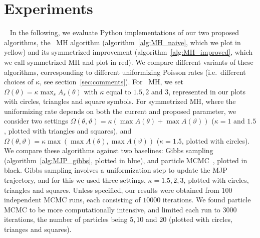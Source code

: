 \vspace{-.2in}
\section{Experiments}\label{sec:expts}~
In the following, we evaluate Python implementations of our two proposed
algorithms, the \naive\ MH algorithm (algorithm~\ref{alg:MH_naive}, which we
plot in yellow) and its symmetrized improvement (algorithm~\ref{alg:MH_improved}, 
which we call symmetrized MH and plot in red). We compare 
different variants of these algorithms, corresponding to different 
uniformizing Poisson rates (i.e.\ different choices of $\kappa$, see 
section~\ref{sec:comments}). For \naive\ MH, %
we set $\Omega(\theta) = \kappa \max_s A_s(\theta) $ with $\kappa$  equal to 
$1.5, 2$ and $3$, represented in our plots with circles, triangles and square
symbols. For symmetrized MH, %
where the uniformizing rate depends 
on both the current and proposed parameter, we consider two settings
 $\Omega(\theta, \vartheta) = \kappa (\max A(\theta) + \max A(\vartheta))$ 
 ($\kappa = 1$ and $1.5$, plotted with {triangles} and {squares}), and 
$\Omega(\theta, \vartheta) = \kappa \max(\max A(\theta), \max A(\vartheta))$
($\kappa=1.5$, plotted with {circles}).  We compare these
algorithms against two baselines: Gibbs sampling (algorithm~\ref{alg:MJP_gibbs},
plotted in blue), and particle MCMC~\cite{Andrieu10}, plotted in black. Gibbs
sampling involves a uniformization step to update the MJP trajectory, and for this
we used three settings, $\kappa=1.5,2,3$, plotted with circles, {triangles}
and {squares}.  Unless specified, our results were
obtained from $100$ independent MCMC runs, each consisting of $10000$ iterations.
We found particle MCMC to be more computationally intensive, and limited each 
run to $3000$ iterations, the number of particles being $5, 10$ and $20$ 
(plotted with circles, trianges and squares). 


